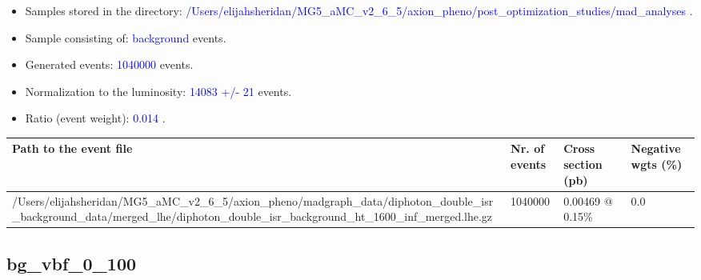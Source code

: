 \documentclass[a4paper, 10pt]{article}
\begin{document}
\begin{itemize}
  \item Samples stored in the directory: \textcolor{blue}{/\-Users/\-elijahsheridan/\-MG5\_aMC\_v2\_6\_5/\-axion\_pheno/\-post\_optimization\_studies/\-mad\_analyses} .
   \item Sample consisting of: \textcolor{blue}{background}  events.
   \item Generated events: \textcolor{blue}{1040000 }  events.
   \item Normalization to the luminosity: \textcolor{blue}{14083}\textcolor{blue}{ +/\-- }\textcolor{blue}{21 }  events.
   \item Ratio (event weight): \textcolor{blue}{0.014 } .  
 
\end{itemize}
\begin{table}[H]
  \begin{center}
    \begin{tabular}{|m{55.0mm}|m{25.0mm}|m{30.0mm}|m{30.0mm}|}
      \hline
      {\cellcolor{yellow}         Path to the event file}& {\cellcolor{yellow}         Nr. of events}& {\cellcolor{yellow}         Cross section (pb)}& {\cellcolor{yellow}         Negative wgts (\%)}\\
      \hline
      {\cellcolor{white}          /\-Users/\-elijahsheridan/\-MG5\_aMC\_v2\_6\_5/\-axion\_pheno/\-madgraph\_data/\-diphoton\_double\_isr\_background\_data/\-merged\_lhe/\-diphoton\_double\_isr\_background\_ht\_1600\_inf\_merged.lhe.gz}& {\cellcolor{white}          1040000}& {\cellcolor{white}          0.00469 @ 0.15\%}& {\cellcolor{white}          0.0}\\
\hline
    \end{tabular}
  \end{center}
\end{table}

\subsection{ bg\_vbf\_0\_100}
\end{document}
